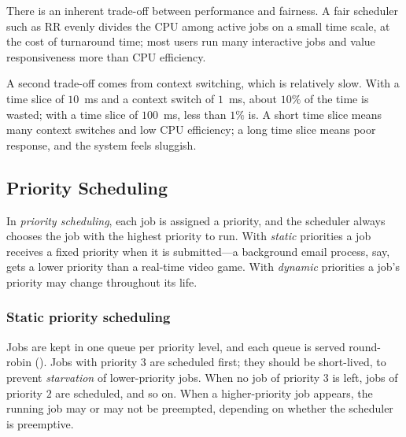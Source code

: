 \begin{keypoint}
  There is an inherent trade-off between performance and fairness. A fair scheduler such as RR evenly divides the CPU among active jobs on a small time scale, at the cost of turnaround time; most users run many interactive jobs and value responsiveness more than CPU efficiency.

  A second trade-off comes from context switching, which is relatively slow. With a time slice of $10$~ms and a context switch of $1$~ms, about $10\%$ of the time is wasted; with a time slice of $100$~ms, less than $1\%$ is. A short time slice means many context switches and low CPU efficiency; a long time slice means poor response, and the system feels sluggish.
\end{keypoint}

\subsection{Priority Scheduling}

\begin{definition}
  In \emph{priority scheduling}, each job is assigned a priority, and the scheduler always chooses the job with the highest priority to run. With \emph{static} priorities a job receives a fixed priority when it is submitted---a background email process, say, gets a lower priority than a real-time video game. With \emph{dynamic} priorities a job's priority may change throughout its life.
\end{definition}

\subsubsection{Static priority scheduling}
Jobs are kept in one queue per priority level, and each queue is served round-robin (). Jobs with priority $3$ are scheduled first; they should be short-lived, to prevent \emph{starvation} of lower-priority jobs. When no job of priority $3$ is left, jobs of priority $2$ are scheduled, and so on. When a higher-priority job appears, the running job may or may not be preempted, depending on whether the scheduler is preemptive.

